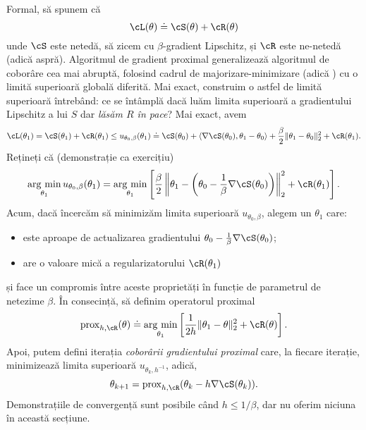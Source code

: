 \documentclass[../../book-main_ro.tex]{subfiles}
\begin{document}
Formal, să spunem că
\begin{equation}
    \cL(\theta) \doteq \cS(\theta) + \cR(\theta)
\end{equation}
unde \(\cS\) este netedă, să zicem cu \(\beta\)-gradient Lipschitz, și \(\cR\) este ne-netedă (adică aspră). Algoritmul de gradient proximal generalizează algoritmul de coborâre cea mai abruptă, folosind cadrul de majorizare-minimizare (adică ) cu o limită superioară globală diferită. Mai exact, construim o astfel de limită superioară întrebând: ce se întâmplă dacă luăm limita superioară a gradientului Lipschitz a lui \(S\) dar \textit{lăsăm \(R\) în pace}? Mai exact, avem
\begin{equation}
    \cL(\theta_{1}) = \cS(\theta_{1}) + \cR(\theta_{1}) \leq u_{\theta_{0}, \beta}(\theta_{1}) \doteq \cS(\theta_{0}) + \ip{\nabla \cS(\theta_{0})}{\theta_{1} - \theta_{0}} + \frac{\beta}{2}\norm{\theta_{1} - \theta_{0}}_{2}^{2} + \cR(\theta_{1}).
\end{equation}
Rețineți că (demonstrație ca exercițiu)
\begin{equation}
    \argmin_{\theta_{1}}u_{\theta_{0}, \beta}(\theta_{1}) = \argmin_{\theta_{1}}\bs{\frac{\beta}{2}\norm*{\theta_{1} - \bp{\theta_{0} - \frac{1}{\beta}\nabla \cS(\theta_{0})}}_{2}^{2} + \cR(\theta_{1})}.
\end{equation}
Acum, dacă încercăm să minimizăm limita superioară \(u_{\theta_{0}, \beta}\), alegem un \(\theta_{1}\) care:
\begin{itemize}
    \item este aproape de actualizarea gradientului \(\theta_{0} - \frac{1}{\beta}\nabla \cS(\theta_{0})\);
    \item are o valoare mică a regularizatorului \(\cR(\theta_{1})\)
\end{itemize}
și face un compromis între aceste proprietăți în funcție de parametrul de netezime \(\beta\). În consecință, să definim operatorul proximal
\begin{equation}
    \prox_{h, \cR}(\theta) \doteq \argmin_{\theta_{1}}\bs{\frac{1}{2h}\norm{\theta_{1} - \theta}_{2}^{2} + \cR(\theta)}.
\end{equation}
Apoi, putem defini iterația \textit{coborârii gradientului proximal} care, la fiecare iterație, minimizează limita superioară \(u_{\theta_{k}, h^{-1}}\), adică,
\begin{equation}
    \theta_{k + 1} = \prox_{h, \cR}(\theta_{k} - h\nabla \cS(\theta_{k})).
\end{equation}
Demonstrațiile de convergență sunt posibile când \(h \leq 1/\beta\), dar nu oferim niciuna în această secțiune.
\end{document}
